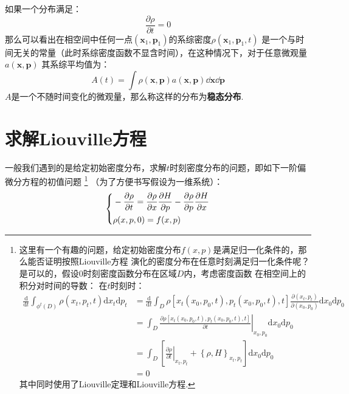     如果一个分布满足：
    \begin{equation}
        \frac {\partial \rho}{\partial t} = 0
    \end{equation}
    那么可以看出在相空间中任何一点$(\bm{x}_1, \bm{p}_1)$的系综密度$\rho(\bm{x}_1, \bm{p}_1, t)$
    是一个与时间无关的常量（此时系综密度函数不显含时间），在这种情况下，对于任意微观量$a(\bm{x}, \bm{p})$
    其系综平均值为：
    \begin{equation}
        A(t) = \int\rho(\bm{x}, \bm{p})a(\bm{x}, \bm{p})\dd \bm{x}\dd \bm{p}
    \end{equation}
    $A$是一个不随时间变化的微观量，那么称这样的分布为\textbf{稳态分布}.

    \section{求解Liouville方程}
    一般我们遇到的是给定初始密度分布，求解$t$时刻密度分布的问题，即如下一阶偏微分方程的初值问题
    \footnote{
        这里有一个有趣的问题，给定初始密度分布$f(x, p)$是满足归一化条件的，那么能否证明按照Liouville方程
        演化的密度分布在任意时刻满足归一化条件呢？是可以的，假设0时刻密度函数分布在区域$D$内，考虑密度函数
        在相空间上的积分对时间的导数：
        在$t$时刻时：
        \begin{equation}
            \begin{split}
                \frac{\mathrm{d}}{\mathrm{d}t}\int_{\phi^{t}(D)}\rho(x_{t}, p_{t},t)\mathrm{d}x_{t}\mathrm{d}p_{t} &= \frac{\mathrm{d}}{\mathrm{d}t}\int_{D}\rho[x_{t}(x_{0},p_{0},t), p_{t}(x_{0},p_{0},t),t]\frac{\partial(x_{t},p_{t})}{\partial(x_{0},p_{0})}\mathrm{d}x_{0}\mathrm{d}p_{0}\\
                &= \int_{D}\left.\frac{\partial \rho[x_{t}(x_{0},p_{0},t), p_{t}(x_{0},p_{0},t),t]}{\partial t}\right|_{x_{0},p_{0}}\mathrm{d}x_{0}\mathrm{d}p_{0}\\
                &= \int_{D}\left[\left.\frac{\partial \rho}{\partial t}\right|_{x_{t},p_{t}} + \left\{\rho, H\right\}_{x_{t},p_{t}}\right]\mathrm{d}x_{0}\mathrm{d}p_{0}\\
                &=0 
            \end{split}
            \label{conservation of density}
        \end{equation}
        其中同时使用了Liouville定理和Liouville方程.  
    }
    （为了方便书写假设为一维系统）：
    \begin{equation}
        \left\{
        \begin{split}
            &-\frac{\partial{\rho}}{\partial{t}} = \frac{\partial{\rho}}{\partial{x}}\frac{\partial{H}}{\partial{p}} - \frac{\partial{\rho}}{\partial{p}}\frac{\partial{H}}{\partial{x}}\\
            &\rho(x, p, 0) = f(x, p)
        \end{split}
        \right.
        \label{Liouville equation Cauchy problem}
    \end{equation}
